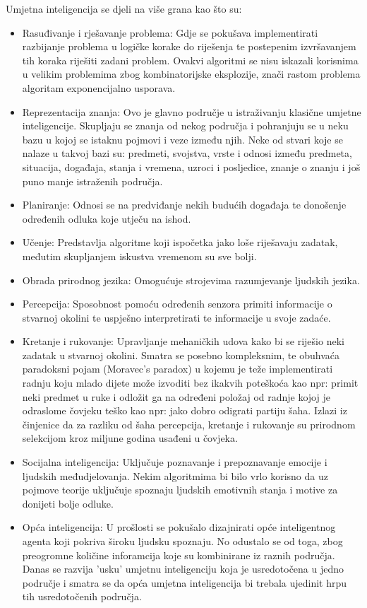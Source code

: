 Umjetna inteligencija se djeli na više grana kao što su:
\begin{itemize}
	\item Rasuđivanje i rješavanje problema: Gdje se pokušava implementirati razbijanje problema u logičke korake do riješenja te postepenim izvršavanjem tih koraka riješiti zadani problem. Ovakvi algoritmi se nisu iskazali korisnima u velikim problemima zbog kombinatorijske eksplozije, znači rastom problema algoritam exponencijalno usporava.
	
	\item Reprezentacija znanja: Ovo je glavno područje u istraživanju klasične umjetne inteligencije. Skupljaju se znanja od nekog područja i pohranjuju se u neku bazu u kojoj se istaknu pojmovi i veze između njih. Neke od stvari koje se nalaze u takvoj bazi su: predmeti, svojstva, vrste i odnosi između predmeta, situacija, događaja, stanja i vremena, uzroci i posljedice, znanje o znanju i još puno manje istraženih područja.
	
	\item Planiranje: Odnosi se na predviđanje nekih budućih događaja te donošenje određenih odluka koje utječu na ishod.
	
	\item Učenje: Predstavlja algoritme koji ispočetka jako loše riješavaju zadatak, međutim skupljanjem iskustva vremenom su sve bolji.
	
	\item Obrada prirodnog jezika: Omogućuje strojevima razumjevanje ljudskih jezika.
	
	\item Percepcija: Sposobnost pomoću određenih senzora primiti informacije o stvarnoj okolini te uspješno interpretirati te informacije u svoje zadaće.
	
	\item Kretanje i rukovanje: Upravljanje mehaničkih udova kako bi se riješio neki zadatak u stvarnoj okolini. Smatra se posebno kompleksnim, te obuhvaća paradoksni pojam (Moravec's paradox) u kojemu je teže implementirati radnju koju mlado dijete može izvoditi bez ikakvih poteškoća kao npr: primit neki predmet u ruke i odložit ga na određeni položaj od radnje kojoj je odraslome čovjeku teško kao npr: jako dobro odigrati partiju šaha. Izlazi iz činjenice da za razliku od šaha percepcija, kretanje i rukovanje su prirodnom selekcijom kroz miljune godina usađeni u čovjeka.
	
	\item Socijalna inteligencija: Uključuje poznavanje i prepoznavanje emocije i ljudskih međudjelovanja. Nekim algoritmima bi bilo vrlo korisno da uz pojmove teorije uključuje spoznaju ljudskih emotivnih stanja i motive za donijeti bolje odluke.
	
	\item Opća inteligencija: U prošlosti se pokušalo dizajnirati opće inteligentnog agenta koji pokriva široku ljudsku spoznaju. No odustalo se od toga, zbog preogromne količine inforamcija koje su kombinirane iz raznih područja. Danas se razvija 'usku' umjetnu inteligenciju koja je usredotočena u jedno područje i smatra se da opća umjetna inteligencija bi trebala ujedinit hrpu tih usredotočenih područja.
\end{itemize}

